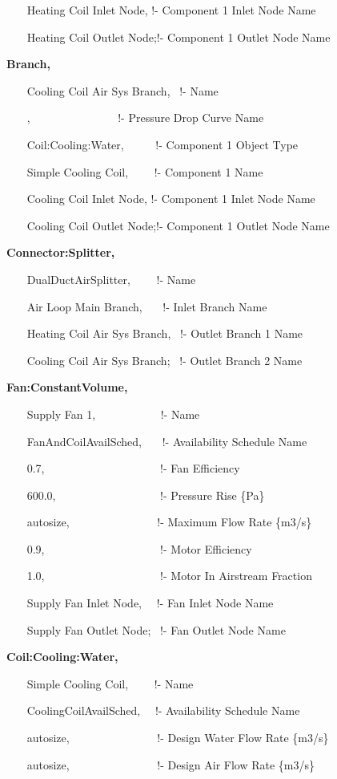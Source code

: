 ~~~ Heating Coil Inlet Node, !- Component 1 Inlet Node Name

~~~ Heating Coil Outlet Node;!- Component 1 Outlet Node Name

\textbf{Branch,}

~~~ Cooling Coil Air Sys Branch,~ !- Name

~~~ ,~~~~~~~~~~~~~~~ !- Pressure Drop Curve Name

~~~ Coil:Cooling:Water,~~~~~ !- Component 1 Object Type

~~~ Simple Cooling Coil,~~~~ !- Component 1 Name

~~~ Cooling Coil Inlet Node, !- Component 1 Inlet Node Name

~~~ Cooling Coil Outlet Node;!- Component 1 Outlet Node Name

\textbf{Connector:Splitter,}

~~~ DualDuctAirSplitter,~~~~ !- Name

~~~ Air Loop Main Branch,~~~ !- Inlet Branch Name

~~~ Heating Coil Air Sys Branch,~ !- Outlet Branch 1 Name

~~~ Cooling Coil Air Sys Branch;~ !- Outlet Branch 2 Name

\textbf{Fan:ConstantVolume,}

~~~ Supply Fan 1,~~~~~~~~~~~ !- Name

~~~ FanAndCoilAvailSched,~~~ !- Availability Schedule Name

~~~ 0.7,~~~~~~~~~~~~~~~~~~~~ !- Fan Efficiency

~~~ 600.0,~~~~~~~~~~~~~~~~~~ !- Pressure Rise \{Pa\}

~~~ autosize,~~~~~~~~~~~~~~~ !- Maximum Flow Rate \{m3/s\}

~~~ 0.9,~~~~~~~~~~~~~~~~~~~~ !- Motor Efficiency

~~~ 1.0,~~~~~~~~~~~~~~~~~~~~ !- Motor In Airstream Fraction

~~~ Supply Fan Inlet Node,~~ !- Fan Inlet Node Name

~~~ Supply Fan Outlet Node;~ !- Fan Outlet Node Name

\textbf{Coil:Cooling:Water,}

~~~ Simple Cooling Coil,~~~~ !- Name

~~~ CoolingCoilAvailSched,~~ !- Availability Schedule Name

~~~ autosize,~~~~~~~~~~~~~~~ !- Design Water Flow Rate \{m3/s\}

~~~ autosize,~~~~~~~~~~~~~~~ !- Design Air Flow Rate \{m3/s\}

